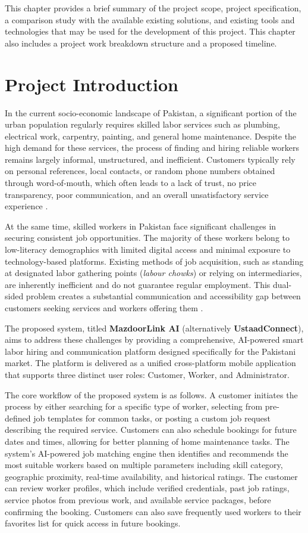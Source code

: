 \documentclass[12pt,a4paper]{report}
\begin{document}
This chapter provides a brief summary of the project scope, project
specification, a comparison study with the available existing solutions, and
existing tools and technologies that may be used for the development of this
project. This chapter also includes a project work breakdown structure and a
proposed timeline.

\section{Project Introduction}

In the current socio-economic landscape of Pakistan, a significant portion of
the urban population regularly requires skilled labor services such as plumbing,
electrical work, carpentry, painting, and general home maintenance. Despite the
high demand for these services, the process of finding and hiring reliable
workers remains largely informal, unstructured, and inefficient. Customers
typically rely on personal references, local contacts, or random phone numbers
obtained through word-of-mouth, which often leads to a lack of trust, no price
transparency, poor communication, and an overall unsatisfactory service
experience \cite{ilo}.

At the same time, skilled workers in Pakistan face significant challenges in
securing consistent job opportunities. The majority of these workers belong to
low-literacy demographics with limited digital access and minimal exposure to
technology-based platforms. Existing methods of job acquisition, such as
standing at designated labor gathering points (\textit{labour chowks}) or
relying on intermediaries, are inherently inefficient and do not guarantee
regular employment. This dual-sided problem creates a substantial communication
and accessibility gap between customers seeking services and workers offering
them \cite{pbs}.

The proposed system, titled \textbf{MazdoorLink AI} (alternatively
\textbf{UstaadConnect}), aims to address these challenges by providing a
comprehensive, AI-powered smart labor hiring and communication platform designed
specifically for the Pakistani market. The platform is delivered as a unified
cross-platform mobile application that supports three distinct user roles:
Customer, Worker, and Administrator.

The core workflow of the proposed system is as follows. A customer initiates
the process by either searching for a specific type of worker, selecting from
pre-defined job templates for common tasks, or posting a custom job request
describing the required service. Customers can also schedule bookings for future
dates and times, allowing for better planning of home maintenance tasks. The
system's AI-powered job matching engine then identifies and recommends the most
suitable workers based on multiple parameters including skill category,
geographic proximity, real-time availability, and historical ratings. The
customer can review worker profiles, which include verified credentials, past
job ratings, service photos from previous work, and available service packages,
before confirming the booking. Customers can also save frequently used workers
to their favorites list for quick access in future bookings.
\end{document}
